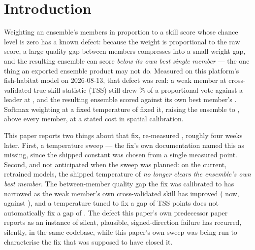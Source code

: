 %

\section{Introduction}

Weighting an ensemble's members in proportion to a skill score whose chance
level is zero has a known defect: because the weight is proportional to the
raw score, a large quality gap between members compresses into a small
weight gap, and the resulting ensemble can score \emph{below its own best
single member} --- the one thing an exported ensemble product may not do.
Measured on this platform's fish-habitat model on 2026-08-13, that defect
was real: a weak member at cross-validated true skill statistic (TSS)
\HistMaxentCV{} still drew \HistMaxentVote{}\% of a proportional vote
against a leader at \HistLgbmCV{}, and the resulting ensemble scored
\HistPropTSS{} against its own best member's \HistBestMemberTSS{}. Softmax
weighting at a fixed temperature of \ShippedTemperature{} fixed it, raising
the ensemble to \HistSoftmaxTSS{}, above every member, at a stated cost in
spatial calibration.

This paper reports two things about that fix, re-measured \AsOf{}, roughly
four weeks later. First, a temperature sweep --- the fix's own
documentation named this as missing, since the shipped constant was chosen
from a single measured point. Second, and not anticipated when the sweep
was planned: on the current, retrained models, the shipped temperature of
\ShippedTemperature{} \emph{no longer clears the ensemble's own best
member}. The between-member quality gap the fix was calibrated to has
narrowed as the weak member's own cross-validated skill has improved
(\CurMaxentCV{} now, against \CurLgbmCV{}), and a temperature tuned to fix
a gap of \HistGap{} TSS points does not automatically fix a gap of
\CurGap{}. The defect this paper's own predecessor paper~\citep{silentfailures2026}
reports as an instance of silent, plausible, signed-direction failure has
recurred, silently, in the same codebase, while this paper's own sweep was
being run to characterise the fix that was supposed to have closed it.

